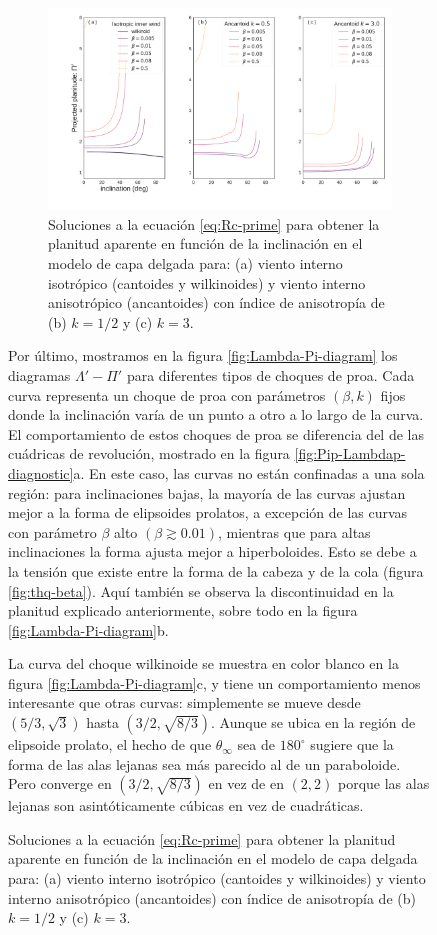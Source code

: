 \begin{figure}
\begin{figure}
  \centering
  \includegraphics[width=\linewidth]{./Figures/Pi-vs-i}
  \caption[Planitud aparente para choques cantoides, ancantoides y wilkinoides.]{Soluciones a la ecuación \ref{eq:Rc-prime} para obtener la planitud aparente en función de la inclinación en el modelo de capa delgada para: (a) viento interno isotrópico (cantoides y wilkinoides) y viento interno anisotrópico (ancantoides) con índice de anisotropía de (b) $k=1/2$ y (c) $k=3$.}
  \label{fig:Pi-vs-inclination}
\end{figure}

Por último, mostramos en la figura \ref{fig:Lambda-Pi-diagram} los diagramas $\Lambda'-\Pi'$ para diferentes tipos de choques de proa. Cada curva representa un choque de proa con parámetros $(\beta, k)$ fijos donde la inclinación varía de un punto a otro a lo largo de la curva. El comportamiento de estos choques de proa se diferencia del de las cuádricas de revolución, mostrado en la figura \ref{fig:Pip-Lambdap-diagnostic}a. En este caso, las curvas no están confinadas a una sola región: para inclinaciones bajas, la mayoría de las curvas ajustan mejor a la forma de elipsoides prolatos, a excepción de las curvas con parámetro $\beta$ alto $(\beta \gtrsim 0.01)$, mientras que para altas inclinaciones la forma ajusta mejor a hiperboloides. Esto se debe a la tensión que existe entre la forma de la cabeza y de la cola (figura \ref{fig:thq-beta}). Aquí también se observa la discontinuidad en la planitud explicado anteriormente, sobre todo en la figura \ref{fig:Lambda-Pi-diagram}b.

La curva del choque wilkinoide se muestra en color blanco en la figura \ref{fig:Lambda-Pi-diagram}c, y tiene un comportamiento menos interesante que otras curvas: simplemente se mueve desde $(5/3, \sqrt{3})$ hasta $(3/2, \sqrt{8/3})$. Aunque se ubica en la región de elipsoide prolato, el hecho de que $\theta_\infty$ sea de $180^\circ$ sugiere que la forma de las alas lejanas sea más parecido al de un paraboloide. Pero converge en $(3/2, \sqrt{8/3})$ en vez de en $(2, 2)$ porque las alas lejanas son asintóticamente cúbicas en vez de cuadráticas.


\end{figure}
